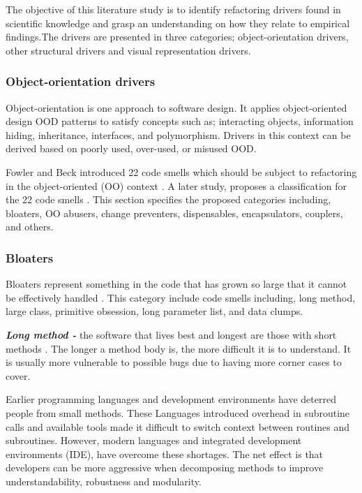 The objective of this literature study is to identify refactoring drivers found in scientific knowledge and grasp an understanding on how they relate to empirical findings.The drivers are presented in three categories; object-orientation drivers, other structural drivers and visual representation drivers. 

\subsubsection{Object-orientation drivers}
Object-orientation is one approach to software design. It applies object-oriented design \gls{OOD} patterns to satisfy concepts such as; interacting objects, information hiding, inheritance, interfaces, and polymorphism. Drivers in this context can be derived based on poorly used, over-used, or misused \gls{OOD}. 

Fowler and Beck introduced 22 code smells which should be subject to refactoring in the object-oriented (\gls{OO}) context \cite{fowlerRefactor}. A later study, proposes a classification for the 22 code smells \cite{mantylaTaxonomy}. This section specifies the proposed categories including, bloaters, \gls{OO} abusers, change preventers, dispensables, encapsulators, couplers, and others. 

\subsubsection*{Bloaters}
Bloaters represent something in the code that has grown so large that it cannot be effectively handled \cite{mantylaTaxonomy}. This category include code smells including, long method, large class, primitive obsession, long parameter list, and data clumps.

\textit{\textbf{Long method -}} the software that lives best and longest are those with short methods \cite{fowlerRefactor}. The longer a method body is, the more difficult it is to understand. It is usually more vulnerable to possible bugs due to having more corner cases to cover.

Earlier programming languages and development environments have deterred people from small methods. These Languages introduced overhead in subroutine calls and available tools made it difficult to switch context between routines and subroutines. However, modern languages and integrated development environments (\gls{IDE}), have overcome these shortages. The net effect is that developers can be more aggressive when decomposing methods to improve understandability, robustness and modularity.  

